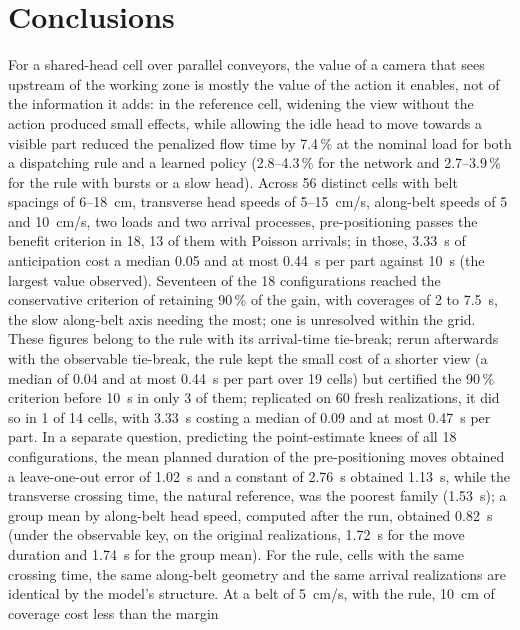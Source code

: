 \documentclass[11pt,a4paper]{article}
\begin{document}
\section{Conclusions}
For a shared-head cell over parallel conveyors, the value of a camera that sees upstream
of the working zone is mostly the value of the action it enables, not of the information
it adds: in the reference cell, widening the view without the action produced small
effects, while allowing the idle head to move towards a visible part reduced the
penalized flow time by 7.4\,\% at the nominal load for both a dispatching rule and a
learned policy (2.8--4.3\,\% for the network and 2.7--3.9\,\% for the rule with bursts
or a slow head). Across 56 distinct cells with belt
spacings of 6--18~cm, transverse head speeds of 5--15~cm/s, along-belt speeds of 5 and
10~cm/s, two loads and two arrival processes, pre-positioning passes the benefit criterion
in 18, 13 of them with Poisson arrivals; in those, 3.33~s of anticipation cost a median
0.05 and at most 0.44~s per part against 10~s (the largest value observed). Seventeen of
the 18 configurations reached the conservative criterion of retaining 90\,\% of the
gain, with coverages of 2 to 7.5~s, the slow along-belt axis needing the most; one is
unresolved within the grid. These figures belong to the rule with its arrival-time
tie-break; rerun afterwards with the observable tie-break, the rule kept the small cost
of a shorter view (a median of 0.04 and at most 0.44~s per part over 19 cells) but
certified the 90\,\% criterion before 10~s in only 3 of them; replicated on 60 fresh
realizations, it did so in 1 of 14 cells, with 3.33~s costing a median of 0.09 and at most
0.47~s per part. In a separate question, predicting the point-estimate knees
of all 18 configurations, the mean planned duration of the pre-positioning moves
obtained a leave-one-out error of 1.02~s and a constant of 2.76~s obtained 1.13~s, while
the transverse crossing time, the natural reference, was the poorest family (1.53~s); a
group mean by along-belt head speed, computed after the run, obtained 0.82~s (under the
observable key, on the original realizations, 1.72~s for the move duration and 1.74~s for
the group mean). For the rule, cells with the same crossing time, the same along-belt geometry and the
same arrival realizations are identical by the model's structure. At a belt of 5~cm/s, with the rule, 10~cm of coverage cost less than the margin
\end{document}
